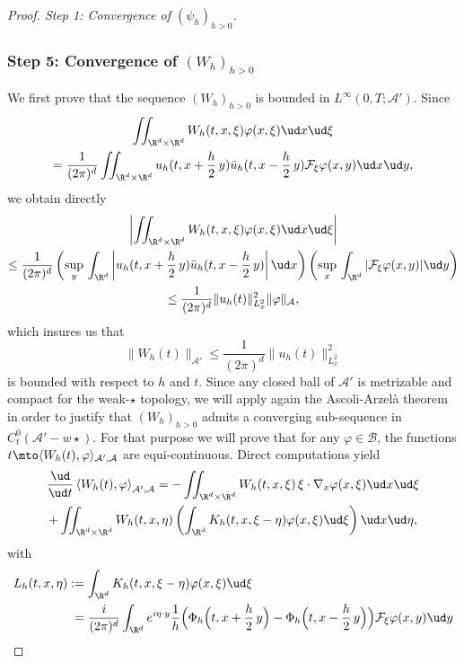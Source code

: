 \begin{proof}[Proof. Step 1: Convergence of $(\psi_{h})_{h>0}$]
\subsubsection*{Step 5: Convergence of $(W_{h})_{h>0}$} We first prove that the sequence $(W_{h})_{h>0}$ is bounded in $L^{\infty}\left(0,T;\mathcal{A}'\right)$. Since
\begin{multline*}
\iint_{\R^{d}\times\R^{d}}W_{h}(t,x,\xi)\varphi(x,\xi)\ud x\ud \xi\\
=\frac{1}{(2\pi)^{d}}\iint_{\R^{d}\times\R^{d}}u_{h}(t,x+\frac{h}{2}\,y)\bar{u}_{h}(t,x-\frac{h}{2}\,y)\mathcal{F}_{\xi}\varphi(x,y)\ud x\ud y,
\end{multline*}
we obtain directly
\begin{multline*}
\left|\iint_{\R^{d}\times\R^{d}}W_{h}(t,x,\xi)\varphi(x,\xi)\ud x\ud \xi\right|\\
\leq\frac{1}{(2\pi)^{d}}\left(\underset{y}{\sup}\,\int_{\R^{d}}\left|u_{h}(t,x+\frac{h}{2}\,y)\bar{u}_{h}(t,x-\frac{h}{2}\,y)\right|\ud x\right)\left(\underset{x}{\sup}\,\int_{\R^{d}}|\mathcal{F}_{\xi}\varphi(x,y)|\ud y\right)\\
\leq\frac{1}{(2\pi)^{d}}\|u_{h}(t)\|_{L_{x}^{2}}^{2}\|\varphi\|_{\mathcal{A}},
\end{multline*}
which insures us that
\[
\|W_{h}(t)\|_{\mathcal{A}'}\leq\frac{1}{(2\pi)^{d}}\|u_{h}(t)\|_{L_{x}^{2}}^{2}
\]
is bounded with respect to $h$ and $t$. Since any closed ball of $\mathcal{A}'$ is metrizable and compact for the weak-$\star$ topology, we will apply again the Ascoli-Arzelà theorem in order to justify that $(W_{h})_{h>0}$ admits a converging sub-sequence in $C_{t}^{0}(\mathcal{A}'-w\star)$. For that purpose we will prove that for any $\varphi\in\mathcal{B}$, the functions $t\mto \langle W_{h}(t),\varphi\rangle_{\mathcal{A}',\mathcal{A}}$ are equi-continuous. Direct computations yield
\begin{multline}\label{eq_on_Wh}
\frac{\ud}{\ud t}\left\langle W_{h}(t),\varphi\right\rangle_{\mathcal{A}',\mathcal{A}}=-\iint_{\R^{d}\times\R^{d}}W_{h}(t,x,\xi)\,\xi\cdot\nabla_{x}\varphi(x,\xi)\ud x\ud\xi\\
+\iint_{\R^{d}\times\R^{d}}W_{h}(t,x,\eta)\left(\int_{\R^{d}}K_{h}(t,x,\xi-\eta)\varphi(x,\xi)\ud\xi\right)\ud x\ud\eta,
\end{multline}
with
\begin{align*}
L_{h}(t,x,\eta)&:=\int_{\R^{d}}K_{h}(t,x,\xi-\eta)\varphi(x,\xi)\ud\xi\\
&\hphantom{:}=\frac{i}{(2\pi)^{d}}\int_{\R^{d}}e^{i\eta\cdot y}\frac{1}{h}\Bigl(\Phi_{h}\Bigl(t,x+\frac{h}{2}\,y\Bigr)-\Phi_{h}\Bigl(t,x-\frac{h}{2}\,y\Bigr)\Bigr)\mathcal{F}_{\xi}\varphi(x,y)\ud y

\end{align*}
\end{proof}
